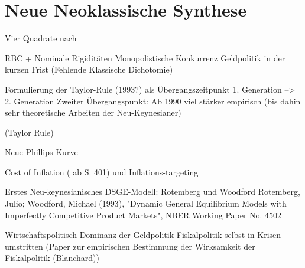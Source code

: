%
%
%

\chapter{Neue Neoklassische Synthese}
\label{Neue Neoklassische Synthese}

Vier Quadrate nach \textcite{RomerDavid1993}




RBC + \textcite{RomerDavid1990}
Nominale Rigiditäten
Monopolistische Konkurrenz
Geldpolitik in der kurzen Frist (Fehlende Klassische Dichotomie)

Formulierung der Taylor-Rule (1993?) als  Übergangszeitpunkt 1. Generation --> 2. Generation
Zweiter Übergangspunkt: Ab 1990 viel stärker empirisch (bis dahin sehr theoretische Arbeiten der Neu-Keynesianer)

(Taylor Rule)

Neue Phillips Kurve

Cost of Inflation (\textcite{Snowdon2005} ab S. 401) und Inflations-targeting

Erstes Neu-keynesianisches DSGE-Modell: Rotemberg und Woodford
Rotemberg, Julio; Woodford, Michael (1993), "Dynamic General Equilibrium Models with Imperfectly Competitive Product Markets", NBER Working Paper No. 4502

Wirtschaftspolitisch Dominanz der Geldpolitik
Fiskalpolitik selbst in Krisen umstritten (Paper zur empirischen Bestimmung der Wirksamkeit der Fiskalpolitik (Blanchard))



